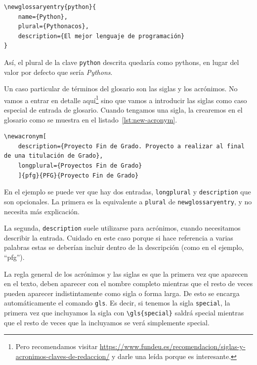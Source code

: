 \begin{lstlisting}[language={[latex]TeX},caption=Especificando el plural para un término del glosario,label=lst:gls-longplural]
\newglossaryentry{python}{
    name={Python},
    plural={Pythonacos},
    description={El mejor lenguaje de programación}
}
\end{lstlisting}

Así, el plural de la clave \texttt{python} descrita quedaría como \glspl{python}, en lugar del valor por defecto que sería \textit{Pythons}.

Un caso particular de términos del glosario son las siglas y los acrónimos. No vamos a entrar en detalle aquí\footnote{Pero recomendamos visitar \href{https://www.fundeu.es/recomendacion/siglas-y-acronimos-claves-de-redaccion/}{https://www.fundeu.es/recomendacion/siglas-y-acronimos-claves-de-redaccion/} y darle una leída porque es interesante.} sino que vamos a introducir las siglas como caso especial de entrada de glosario. Cuando tengamos una sigla, la crearemos en el glosario como se muestra en el listado~\ref{lst:new-acronym}.

\begin{lstlisting}[language={[latex]TeX},caption=Entrada genérica de una sigla o acrónimo en el glosario,label=lst:new-acronym]
\newacronym[
    description={Proyecto Fin de Grado. Proyecto a realizar al final de una titulación de Grado},
    longplural={Proyectos Fin de Grado}
    ]{pfg}{PFG}{Proyecto Fin de Grado}
\end{lstlisting}

En el ejemplo se puede ver que hay dos entradas, \texttt{longplural} y \texttt{description} que son opcionales. La primera es la equivalente a \texttt{plural} de \texttt{newglossaryentry}, y no necesita más explicación.

La segunda, \texttt{description} suele utilizarse para acrónimos, cuando necesitamos describir la entrada. Cuidado en este caso porque si hace referencia a varias palabras estas se deberían incluir dentro de la descripción (como en el ejemplo, \enquote{\acrlong{pfg}}).

La regla general de los acrónimos y las siglas es que la primera vez que aparecen en el texto, deben aparecer con el nombre completo mientras que el resto de veces pueden aparecer indistintamente como sigla o forma larga. De esto se encarga automáticamente el comando \texttt{gls}. Es decir, si tenemos la sigla \texttt{special}, la primera vez que incluyamos la sigla con \texttt{\textbackslash gls\{special\}} saldrá \gls{special} mientras que el resto de veces que la incluyamos se verá simplemente \gls{special}.

